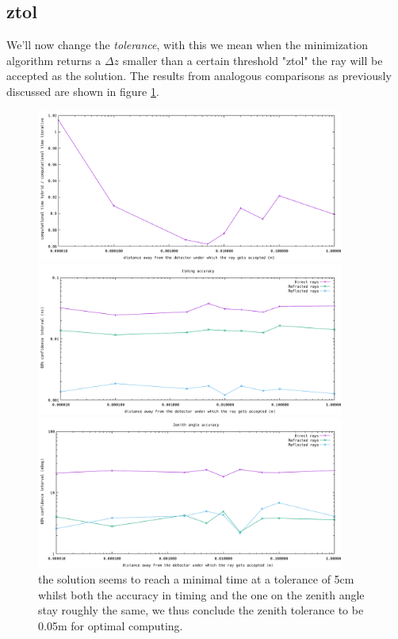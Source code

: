 \subsection{ztol}
We'll now change the \textit{tolerance}, with this we mean when 
the minimization algorithm returns a $\Delta z$ smaller than a certain
threshold "ztol" the ray will be accepted as the solution.  
The results from analogous comparisons as
previously discussed are shown in figure \ref{fig:ztolinfl}.
\begin{figure}
	\centering
	\begin{minipage}{\textwidth}
		\includegraphics[width=0.9\textwidth]{figures/ZtolVsTime2.pdf}
	\end{minipage}
	\begin{minipage}{\textwidth}
		\includegraphics[width=0.9\textwidth]{figures/ZtolVsSigmaTime.pdf}
	\end{minipage}
	\begin{minipage}{\textwidth}
		\includegraphics[width=0.9\textwidth]{figures/ZtolVsSigmaAZ.pdf}
	\end{minipage}
\caption{the solution seems to reach a minimal time at a tolerance of 5cm whilst both the accuracy in timing and the one on the zenith angle stay roughly the same, we thus conclude the zenith
tolerance to be 0.05m for optimal computing.}
\label{fig:ztolinfl}
\end{figure}
